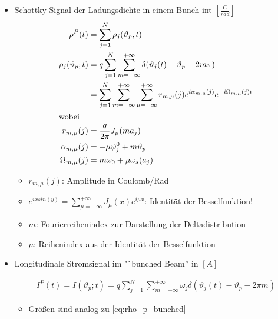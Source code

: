 \documentclass[12pt]{article}%
\renewcommand{\theta}{\vartheta}
\begin{document}
\begin{itemize}
\item Schottky Signal der Ladungsdichte in einem Bunch int $[ \frac{C}{rad}]$
\begin{subequations}
\begin{align}
 	\label{eq:rho_p_bunched}
 	\rho^P(t) &= \sum_{j=1}^{N} \rho_j(\theta_p, t) \\ \rho_j(\theta_p;t)&=q\sum_{j=1}^{N}\sum_{m=-\infty}^{+\infty}  \delta(\theta_j(t) - \theta_p - 2m\pi) \\
 	&= \sum_{j=1}^{N}\sum_{m=-\infty}^{+\infty}\sum_{\mu = - \infty}^{+\infty} r_{m,\mu}(j) e^{i \alpha_{m,\mu}(j)}e^{-i\Omega_{m,\mu}(j)t} \\
\intertext{wobei}
\nonumber r_{m,\mu}(j) &= \frac{q}{2\pi} J_\mu(ma_j) \\
\nonumber \alpha_{m,\mu}(j) &= -\mu \psi_{j}^0+m\theta_p \\
\nonumber \Omega_{m,\mu}(j) &=m\omega_{0} +\mu \omega_s (a_j)
\end{align}
\end{subequations}

\begin{itemize}
	\item $r_{m,\mu}(j)$: Amplitude in Coulomb/Rad

	\item $e^{ix sin(y)}=\sum_{\mu= - \infty}^{+\infty} J_{\mu}(x)e^{i\mu x}$: Identität der Besselfunktion!
	
	\item $m$: Fourierreihenindex zur Darstellung der Deltadistribution
	\item $\mu$: Reihenindex aus der Identität der Besselfunktion
	
	
\end{itemize}
\end{itemize}

\begin{itemize}
	\item Longitudinale Stromsignal im "`bunched Beam'' in $[A]$
	
	\begin{align}
		I^P(t) = I(\theta_p;t) = q \sum_{j = 1}^{N} \sum_{m=-\infty}^{+\infty} \omega_j \delta(\theta_j(t)- \theta_p - 2\pi m)
	\end{align}
\begin{itemize}
	\item Größen sind analog zu \eqref{eq:rho_p_bunched} 
	
\end{itemize}
\end{itemize}
\end{document}
